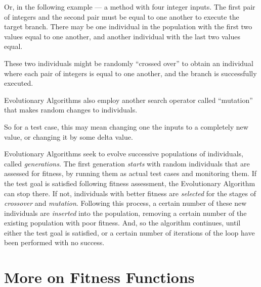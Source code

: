 
Or, in the following example --- a method with four integer inputs. The first
pair of integers and the second pair must be equal to one another to execute the
target branch. There may be one individual in the population with the first two
values equal to one another, and another individual with the last two values
equal. 


These two individuals might be randomly ``crossed over'' to obtain an individual
where each pair of integers is equal to one another, and the branch is
successfully executed.



Evolutionary Algorithms also employ another search operator called ``mutation''
that makes random changes to individuals. 


So for a test case, this may mean changing one the inputs to a completely new
value, or changing it by some delta value. 



Evolutionary Algorithms seek to evolve successive populations of
individuals, called {\it generations}. The first generation {\it starts} with random
individuals that are assessed for fitness, by running them as actual test cases
and monitoring them. If the test goal is satisfied following fitness assessment,
the Evolutionary Algorithm can stop there. If not, individuals with better
fitness are {\it selected} for the stages of {\it crossover} and {\it mutation}.
Following this process, a certain number of these new individuals are {\it
inserted} into the population, removing a certain number of the existing
population with poor fitness. And, so the algorithm continues, until either the
test goal is satisfied, or a certain number of iterations of the loop have been
performed with no success.



\section{More on Fitness Functions}

